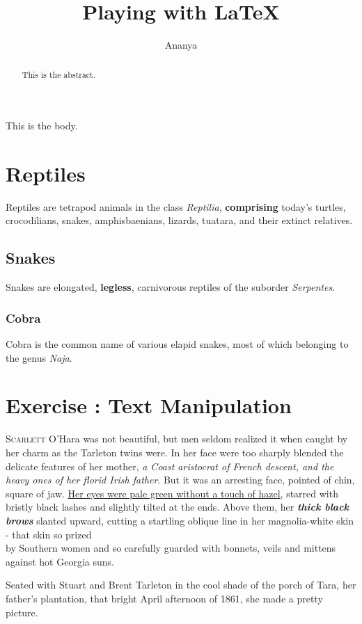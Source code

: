 \documentclass[]{article}
\begin{document}
\title{Playing with \LaTeX{}}
\author{Ananya}
\maketitle

\begin{abstract}
This is the abstract.
\end{abstract}
This is the body.\cite{wikilatex}
\section{Reptiles}
Reptiles are tetrapod animals in the class
\emph{Reptilia}, \textbf{comprising} today's turtles, crocodilians, snakes, amphisbaenians, lizards, tuatara, and their extinct relatives. 
\subsection{Snakes}
Snakes are elongated, \textbf{legless}, carnivorous reptiles of the suborder \emph{Serpentes}. 
\subsubsection{Cobra}
Cobra is the common name of various elapid snakes, most of which belonging to the genus \emph{Naja}. 

\section{Exercise : Text Manipulation}
\lettrine{S}{carlett} O'Hara was not beautiful, but men seldom realized it when caught by her charm as the Tarleton twins were. In her face were too sharply blended the delicate features of her mother, \textit{a Coast aristocrat of \emph{French} descent, and the heavy ones of her florid \emph{Irish} father}. But it was an arresting face, pointed of chin, square of jaw. \underline{Her eyes were pale green without a touch of hazel}, starred with bristly black lashes and slightly tilted at the ends. Above them, her \textbf{\textit{thick black brows}} slanted upward, cutting a startling oblique line in her magnolia-white skin - that skin so prized \\by Southern women and so carefully guarded with bonnets, veils and mittens against hot Georgia suns.
\par Seated with Stuart and Brent Tarleton in the cool shade of the porch of Tara, her father's plantation, that bright April afternoon of 1861, she made a pretty picture. 
\end{document}
